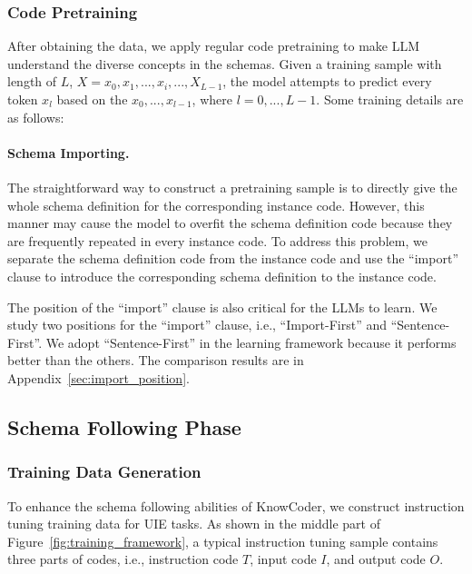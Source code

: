 \subsubsection{Code Pretraining}

After obtaining the data, we apply regular code pretraining to make LLM understand the diverse concepts in the schemas. Given a training sample with length of $L$, $X = {x_0, x_1, ..., x_{i}, ..., X_{L-1}}$, the model attempts to predict every token $x_{l}$ based on the ${x_0, ..., x_{l-1}}$, where $l={0,...,L-1}$. Some training details are as follows:

\paragraph{Schema Importing.}
The straightforward way to construct a pretraining sample is to directly give the whole schema definition for the corresponding instance code. However, this manner may cause the model to overfit the schema definition code because they are frequently repeated in every instance code. To address this problem, we separate the schema definition code from the instance code and use the ``import'' clause to introduce the corresponding schema definition to the instance code.

The position of the ``import'' clause is also critical for the LLMs to learn. We study two positions for the ``import'' clause, i.e., ``Import-First'' and ``Sentence-First''. We adopt ``Sentence-First'' in the learning framework because it performs better than the others. The comparison results are in Appendix~\ref{sec:import_position}.

\subsection{Schema Following Phase}

\subsubsection{Training Data Generation}

  To enhance the schema following abilities of KnowCoder, we construct instruction tuning training data for UIE tasks. As shown in the middle part of Figure~\ref{fig:training_framework}, a typical instruction tuning sample contains three parts of codes, i.e., instruction code $T$, input code $I$, and output code $O$. 
  
